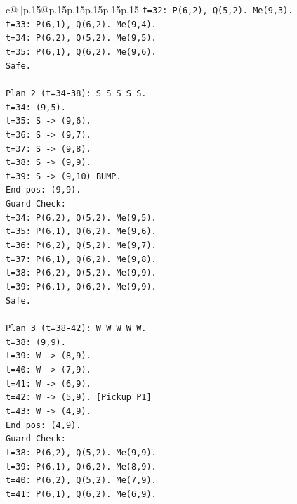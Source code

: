 \documentclass{article}
\begin{document}
{\begin{supertabular}{c@{$\;$}|p{.15\linewidth}@{}p{.15\linewidth}p{.15\linewidth}p{.15\linewidth}p{.15\linewidth}p{.15\linewidth}}
{{{\texttt{t=32: P(6,2), Q(5,2). Me(9,3).} \\
\texttt{t=33: P(6,1), Q(6,2). Me(9,4).} \\
\texttt{t=34: P(6,2), Q(5,2). Me(9,5).} \\
\texttt{t=35: P(6,1), Q(6,2). Me(9,6).} \\
\texttt{Safe.} \\
\\ 
\texttt{Plan 2 (t=34{-}38): S S S S S.} \\
\texttt{t=34: (9,5).} \\
\texttt{t=35: S {-}> (9,6).} \\
\texttt{t=36: S {-}> (9,7).} \\
\texttt{t=37: S {-}> (9,8).} \\
\texttt{t=38: S {-}> (9,9).} \\
\texttt{t=39: S {-}> (9,10) BUMP.} \\
\texttt{End pos: (9,9).} \\
\texttt{Guard Check:} \\
\texttt{t=34: P(6,2), Q(5,2). Me(9,5).} \\
\texttt{t=35: P(6,1), Q(6,2). Me(9,6).} \\
\texttt{t=36: P(6,2), Q(5,2). Me(9,7).} \\
\texttt{t=37: P(6,1), Q(6,2). Me(9,8).} \\
\texttt{t=38: P(6,2), Q(5,2). Me(9,9).} \\
\texttt{t=39: P(6,1), Q(6,2). Me(9,9).} \\
\texttt{Safe.} \\
\\ 
\texttt{Plan 3 (t=38{-}42): W W W W W.} \\
\texttt{t=38: (9,9).} \\
\texttt{t=39: W {-}> (8,9).} \\
\texttt{t=40: W {-}> (7,9).} \\
\texttt{t=41: W {-}> (6,9).} \\
\texttt{t=42: W {-}> (5,9). {[}Pickup P1{]}} \\
\texttt{t=43: W {-}> (4,9).} \\
\texttt{End pos: (4,9).} \\
\texttt{Guard Check:} \\
\texttt{t=38: P(6,2), Q(5,2). Me(9,9).} \\
\texttt{t=39: P(6,1), Q(6,2). Me(8,9).} \\
\texttt{t=40: P(6,2), Q(5,2). Me(7,9).} \\
\texttt{t=41: P(6,1), Q(6,2). Me(6,9).} \\
}}}
\end{supertabular}}
\end{document}
